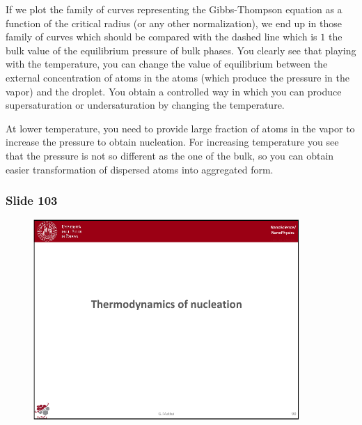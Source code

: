 \documentclass[../main/main.tex]{subfiles}
\begin{document}
If we plot the family of curves representing the Gibbs-Thompson equation as a function of the critical radius (or any other normalization), we end up in those family of curves which should be compared with the dashed line which is \( 1 \) the bulk value of the equilibrium pressure of bulk phases. You clearly see that playing with the temperature, you can change the value of equilibrium between the external concentration of atoms in the atoms (which produce the pressure in the vapor) and the droplet. You obtain a controlled way in which you can produce supersaturation or undersaturation by changing the temperature.

At lower temperature, you need to provide large fraction of atoms in the vapor to increase the pressure to obtain nucleation. For increasing temperature you see that the pressure is not so different as the one of the bulk, so you can obtain easier transformation of dispersed atoms into aggregated form.


\newpage
\subsubsection{Slide 103}

\begin{figure}[h!]
\centering
\includegraphics[page=14,width=0.9\textwidth]{../lessons/pdf_file/6_lesson.pdf}
\end{figure}
\end{document}
